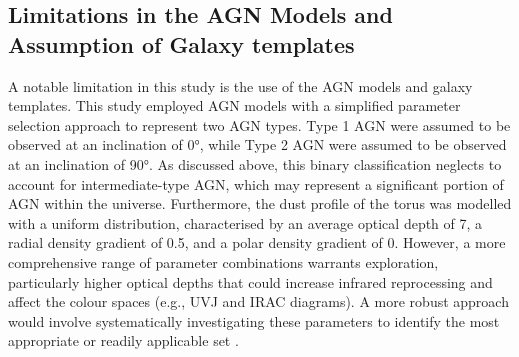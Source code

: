 \subsection{Limitations in the AGN Models and Assumption of Galaxy templates}
A notable limitation in this study is the use of the AGN models and galaxy templates. This study employed AGN models with a simplified parameter selection approach to represent two AGN types.  Type 1 AGN were assumed to be observed at an inclination of 0°, while Type 2 AGN were assumed to be observed at an inclination of 90°. As discussed above, this binary classification neglects to account for intermediate-type AGN, which may represent a significant portion of AGN within the universe. Furthermore, the dust profile of the torus was modelled with a uniform distribution, characterised by an average optical depth of 7, a radial density gradient of 0.5, and a polar density gradient of 0. However, a more comprehensive range of parameter combinations warrants exploration, particularly higher optical depths that could increase infrared reprocessing and affect the colour spaces (e.g., UVJ and IRAC diagrams). A more robust approach would involve systematically investigating these parameters to identify the most appropriate or readily applicable set \citep{gonzalez-martin_role_2023}.\\\\ 
